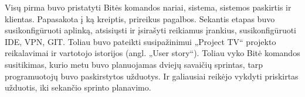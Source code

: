 \smallskip
Visų pirma buvo pristatyti Bitės komandos nariai, sistema, sistemos paskirtis ir klientas. Papasakota į ką kreiptis, prireikus pagalbos. Sekantis etapas buvo
susikonfigūruoti aplinką, atsisiųsti ir įsirašyti reikiamus įrankius, susikonfigūruoti IDE, VPN, GIT. Toliau buvo pateikti susipažinimui „Project TV“ projekto reikalavimai ir
vartotojo istorijos (angl. „User story“). Toliau vyko Bitė komandos susitikimas, kurio metu buvo planuojamas dviejų savaičių sprintas, tarp programuotojų buvo paskirstytos
užduotys. Ir galiausiai reikėjo vykdyti priskirtas užduotis, iki sekančio sprinto planavimo.